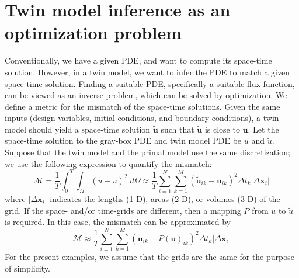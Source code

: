 \documentclass[a4paper,onecolumn]{article}
\theoremstyle{remark}
\begin{document}


\section{Twin model inference as an optimization problem}
\label{inverse}
\indent 
Conventionally, we have a given PDE, and want to compute
its space-time solution. However, in a twin model, we want to infer the PDE
to match a given space-time solution.
Finding a suitable PDE, specifically a suitable flux function, can be viewed
as an inverse problem, which can be solved by optimization.
We define a metric for the mismatch of the space-time solutions.
Given the same inputs (design variables, initial conditions, and boundary conditions), 
a twin model should yield a space-time solution $\tilde{\boldsymbol{u}}$ such that 
$\tilde{\boldsymbol{u}}$ is close to $\boldsymbol{u}$. 
Let the space-time solution to the gray-box PDE and twin model PDE be
$u$ and $\tilde{u}$.
Suppose that the twin model and the 
primal model use the same discretization; we use the following expression to quantify
the mismatch:
\begin{equation}
    \mathcal{M} = \frac{1}{T} \int_0^T \int_\Omega (\tilde{u} - u)^2\; d\Omega
    \approx
    \frac{1}{T}
    \sum_{i=1}^{N}\sum_{k=1}^{M} \left(\tilde{\boldsymbol{u}}_{ik} 
    - \boldsymbol{u}_{ik}\right)^2 \Delta t_k
    \left| \Delta \mathbf{x}_i \right|
    \label{minimizer twin model discrete}
\end{equation}
where $\left| \Delta \mathbf{x}_i \right|$ indicates the lengths (1-D), areas (2-D), or volumes (3-D) 
of the grid.
If the space- and/or time-grids are different, then a mapping $P$ from $u$ to $\tilde{u}$ is required.
In this case, the mismatch can be approximated by
\begin{equation}
    \mathcal{M} \approx
    \frac{1}{T}
    \sum_{i=1}^{N}\sum_{k=1}^{M} \left(\tilde{\boldsymbol{u}}_{ik} - P(\boldsymbol{u})_{ik}\right)^2 
    \Delta t_k
    \left| \Delta \mathbf{x}_i \right|
    \label{minimizer twin model discrete mapping}
\end{equation}
For the present examples, we assume that the grids are the same for the purpose of simplicity.\\
\end{document}
